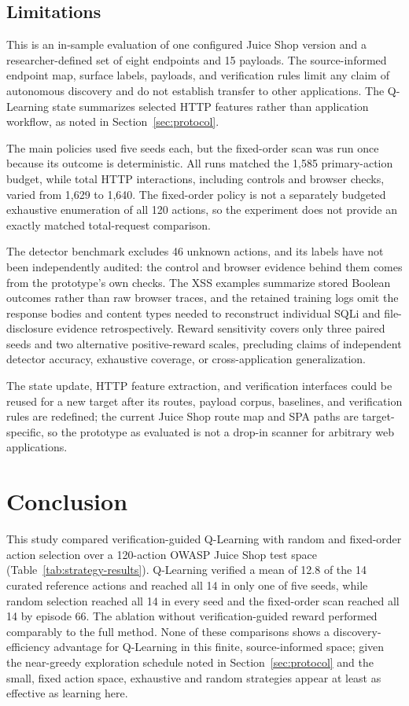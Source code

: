 \documentclass[conference, a4paper]{IEEEtran}
\begin{document}
\subsection{Limitations}
\label{sec:limitations}

This is an in-sample evaluation of one configured Juice Shop
version and a researcher-defined set of eight endpoints and 15
payloads. The source-informed endpoint map, surface labels,
payloads, and verification rules limit any claim of autonomous
discovery and do not establish transfer to other applications. The
Q-Learning state summarizes selected HTTP features rather than
application workflow, as noted in Section~\ref{sec:protocol}.

The main policies used five seeds each, but the fixed-order scan
was run once because its outcome is deterministic. All runs matched
the 1,585 primary-action budget, while total HTTP interactions,
including controls and browser checks, varied from 1,629 to 1,640.
The fixed-order policy is not a separately budgeted exhaustive
enumeration of all 120 actions, so the experiment does not provide
an exactly matched total-request comparison.

The detector benchmark excludes 46 unknown actions, and its labels
have not been independently audited: the control and browser
evidence behind them comes from the prototype's own checks. The
XSS examples summarize stored Boolean outcomes rather than raw
browser traces, and the retained training logs omit the response
bodies and content types needed to reconstruct individual SQLi and
file-disclosure evidence retrospectively. Reward sensitivity covers
only three paired seeds and two alternative positive-reward scales,
precluding claims of independent detector accuracy, exhaustive
coverage, or cross-application generalization.

The state update, HTTP feature extraction, and verification
interfaces could be reused for a new target after its routes,
payload corpus, baselines, and verification rules are redefined;
the current Juice Shop route map and SPA paths are target-specific,
so the prototype as evaluated is not a drop-in scanner for
arbitrary web applications.

\section{Conclusion}

This study compared verification-guided Q-Learning with random and
fixed-order action selection over a 120-action OWASP Juice Shop test
space (Table~\ref{tab:strategy-results}). Q-Learning verified a mean
of 12.8 of the 14 curated reference actions and reached all 14 in
only one of five seeds, while random selection reached all 14 in
every seed and the fixed-order scan reached all 14 by episode 66.
The ablation without verification-guided reward performed
comparably to the full method. None of these comparisons shows a
discovery-efficiency advantage for Q-Learning in this finite,
source-informed space; given the near-greedy exploration schedule
noted in Section~\ref{sec:protocol} and the small, fixed action
space, exhaustive and random strategies appear at least as effective
as learning here.
\end{document}
